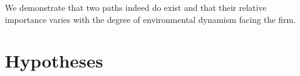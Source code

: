 \documentclass[review,fleqn]{elsarticle}\usepackage[]{graphicx}\usepackage[]{color}
\begin{document}






We demonstrate that two paths indeed do exist and that their relative importance varies
with the degree of environmental dynamism facing the firm.

\section{Hypotheses}\label{sec:hyp}

\end{document}
